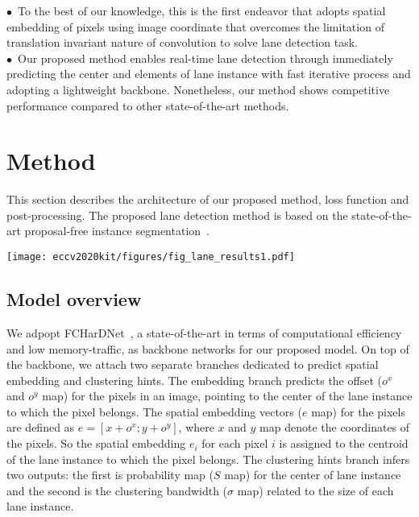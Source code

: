 \documentclass[runningheads]{llncs}
\newenvironment{myindentpar}[1]{\begin{list}{}{\setlength{\leftmargin}{#1}}\item[]}
  {\end{list}}
\begin{document}
\begin{myindentpar}{0.2cm}
\vspace*{-0.1cm}
\noindent$\bullet$ \,To the best of our knowledge, this is the first endeavor that adopts spatial embedding of pixels using image coordinate that overcomes the limitation of translation invariant nature of convolution to solve lane detection task.
\vspace*{-0.1cm}
\\[0.3em]
$\bullet$ \,Our proposed method enables real-time lane detection through 
immediately predicting the center and elements of lane instance with fast iterative process and adopting a lightweight backbone. Nonetheless, our method shows competitive performance compared to other state-of-the-art methods.
\end{myindentpar}


\vspace*{-0.5cm}
\section{Method}
\vspace*{-0.2cm}
This section describes the architecture of our proposed method, loss function and post-processing. The proposed lane detection method is based on the state-of-the-art proposal-free instance segmentation~\cite{neven2019instance}.

\vspace*{-0.55cm}
\begin{figure*}[ht!]
\centering\texttt{[image: eccv2020kit/figures/fig\_lane\_results1.pdf]}
\vspace*{-0.6cm}
  \caption{Overall pipeline of our model. The details are described in Section~\ref{model_overview}.
}
\label{fig:overall_architecture}
\vspace*{-0.9cm}
\end{figure*}
\vspace*{-0.05cm}
\subsection{Model overview}\label{model_overview}
\vspace*{-0.05cm}
We adpopt FCHarDNet~\cite{Chao_2019_ICCV}, a state-of-the-art in terms of computational efficiency and low memory-traffic, as backbone networks for our proposed model. On top of the backbone, we attach two separate branches dedicated to predict spatial embedding and clustering hints.
The embedding branch predicts the offset ($o^x$ and $o^y$ map) for the pixels in an image, pointing to the center of the lane instance to which the pixel belongs. The spatial embedding vectors ($e$ map) for the pixels are defined as $e=[x+o^{x};y+o^{y}]$, where $x$ and $y$ map denote the coordinates of the pixels. So the spatial embedding $e_i$ for each pixel $i$ is assigned to the centroid of the lane instance to which the pixel belongs.
The clustering hints branch infers two outputs: the first is probability map ($S$ map) for the center of lane instance and the second is the clustering bandwidth ($\sigma$ map) related to the size of each lane instance.
\end{document}
